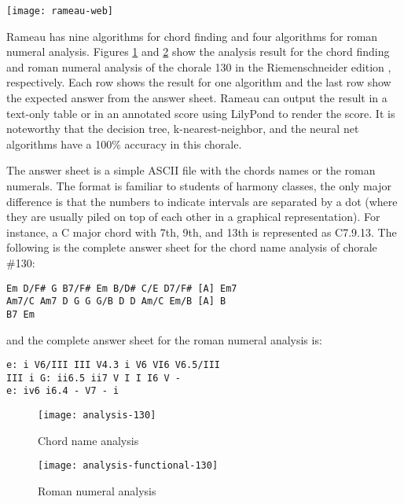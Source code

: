 \begin{figure*}
  \centering
  \texttt{[image: rameau-web]}
  \caption{Rameau's web interface}
  \label{fig:rameau-web}
\end{figure*}

Rameau has nine algorithms for chord finding and four algorithms for
roman numeral analysis. Figures \ref{fig:chord-name-analysis} and
\ref{fig:roman-analysis} show the analysis result for the chord
finding and roman numeral analysis of the chorale 130 in the
Riemenschneider edition \cite{bach41:371} , respectively. Each row
shows the result for one algorithm and the last row show the expected
answer from the answer sheet. Rameau can output the result in a
text-only table or in an annotated score using LilyPond
\cite{nienhuys.ea08:lilypond} to render the score. It is noteworthy
that the decision tree, k-nearest-neighbor, and the neural net
algorithms have a 100\% accuracy in this chorale.

The answer sheet is a simple ASCII file with the chords names or the
roman numerals. The format is familiar to students of harmony classes,
the only major difference is that the numbers to indicate intervals
are separated by a dot (where they are usually piled on top of each
other in a graphical representation). For instance, a C major chord
with 7th, 9th, and 13th is represented as C7.9.13. The following is
the complete answer sheet for the chord name analysis of chorale
\#130:

\begin{verbatim}
Em D/F# G B7/F# Em B/D# C/E D7/F# [A] Em7
Am7/C Am7 D G G G/B D D Am/C Em/B [A] B 
B7 Em
\end{verbatim}

and the complete answer sheet for the roman numeral analysis is:

\begin{verbatim}
e: i V6/III III V4.3 i V6 VI6 V6.5/III
III i G: ii6.5 ii7 V I I I6 V -
e: iv6 i6.4 - V7 - i
\end{verbatim}

\begin{figure}
  \centering
  \texttt{[image: analysis-130]}
  \caption{Chord name analysis}
  \label{fig:chord-name-analysis}
\end{figure}
\begin{figure}
  \centering
  \texttt{[image: analysis-functional-130]}  
  \caption{Roman numeral analysis}
  \label{fig:roman-analysis}
\end{figure}

